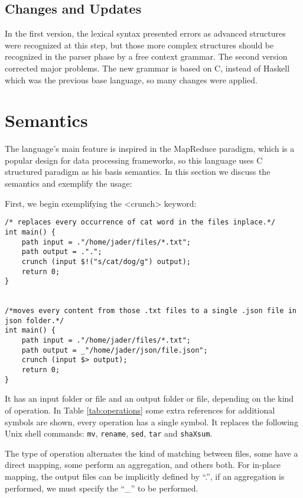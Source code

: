 \documentclass{article}
\begin{document}
\subsection{Changes and Updates}
In the first version, the lexical syntax presented errors as advanced structures
were recognized at this step, but those more complex structures should be
recognized in the parser phase by a free context grammar. The second version
corrected major problems. The new grammar is based on C, instead of Haskell
which was the previous base language, so many changes were applied.


\section{Semantics}
\label{sec:semantics}
The language's main feature is inspired in the MapReduce paradigm, which is a
popular design for data processing frameworks, so this language uses C
structured paradigm as his basis semantics. In this section we discuss the
semantics and exemplify the usage:

First, we begin exemplifying the <crunch> keyword:

\begin{verbatim}
/* replaces every occurrence of cat word in the files inplace.*/
int main() {
    path input = ."/home/jader/files/*.txt";
    path output = .".";
    crunch (input $!("s/cat/dog/g") output);
    return 0;
}


/*moves every content from those .txt files to a single .json file in json folder.*/
int main() {
    path input = ."/home/jader/files/*.txt";
    path output = _"/home/jader/json/file.json";
    crunch (input $> output);
    return 0;
}
\end{verbatim}

It has an input folder or file and an output folder or file, depending on the
kind of operation.  In Table \ref{tab:operations} some extra references for
additional symbols are shown, every operation has a single symbol. It replaces
the following Unix shell commands: \texttt{mv}, \texttt{rename}, \texttt{sed},
\texttt{tar} and \texttt{shaXsum}.

The type of operation alternates the kind of matching between files, some have
a direct mapping, some perform an aggregation, and others both. For in-place
mapping, the output files can be implicitly defined by ``.'', if an aggregation
is performed, we must specify the  ``\_'' to be performed.
\end{document}
